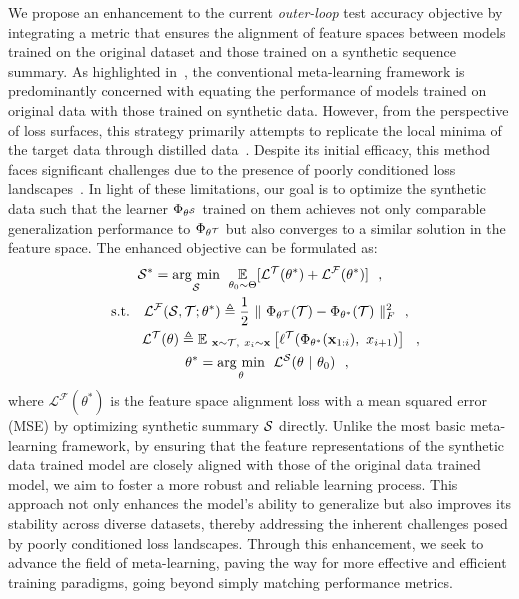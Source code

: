 We propose an enhancement to the current \emph{outer-loop} test accuracy objective by integrating a metric that ensures the alignment of feature spaces between models trained on the original dataset and those trained on a synthetic sequence summary. As highlighted in~\cite{lei2023comprehensive}, the conventional meta-learning framework is predominantly concerned with equating the performance of models trained on original data with those trained on synthetic data. However, from the perspective of loss surfaces, this strategy primarily attempts to replicate the local minima of the target data through distilled data~\cite{li2018visualizing}. Despite its initial efficacy, this method faces significant challenges due to the presence of poorly conditioned loss landscapes~\cite{sachdeva2023data}. In light of these limitations, our goal is to optimize the synthetic data \syn such that the learner $\Phi_{\theta^{\mathcal{S}}}$ trained on them achieves not only comparable generalization performance to $\Phi_{\theta^{\mathcal{T}}}$ but also converges to a similar solution in the feature space. The enhanced objective can be formulated as:
\begin{equation}
\begin{gathered}
    \mathcal{S}^{*} = \underset{\mathcal{S}}{\operatorname{arg}\,\operatorname{min}}\;\  \underset{\theta_0 \sim \Theta}{\mathbb{E}}[\mathcal{L}^{\mathcal{T}}(\theta^*) + \mathcal{L}^{\mathcal{F}}(\theta^*)] ~~, \\
    \text{s.t.} \quad \mathcal{L}^{\mathcal{F}}(\mathcal{S}, \mathcal{T}; \theta^*) \triangleq \frac{1}{2} ~\Vert~ \Phi_{\theta^{\mathcal{T}}}(\mathcal{T}) - \Phi_{\theta^{*}}(\mathcal{T}) ~\Vert_{F}^{2} ~~, \\
    ~~~\qquad \mathcal{L}^{\mathcal{T}}(\theta) \triangleq \mathbb{E}_{~\mathbf{x} \sim \mathcal{T},~ x_i \sim \mathbf{x}} \left[\ell^{\mathcal{T}}(\Phi_{\theta^{*}}(\mathbf{x}_{1:i}),~ x_{i+1})\right] ~~, \\
    \quad \theta^* = \underset{\theta}{\operatorname{arg}\,\operatorname{min}}\;\  \mathcal{L}^{\mathcal{S}}(\theta ~|~ \theta_0) ~~,
\end{gathered}
\end{equation}
where $\mathcal{L}^{\mathcal{F}}(\theta^*)$ is the feature space alignment loss with a mean squared error (MSE) by optimizing synthetic summary $\mathcal{S}$ directly.
Unlike the most basic meta-learning framework, by ensuring that the feature representations of the synthetic data trained model are closely aligned with those of the original data trained model, we aim to foster a more robust and reliable learning process. This approach not only enhances the model's ability to generalize but also improves its stability across diverse datasets, thereby addressing the inherent challenges posed by poorly conditioned loss landscapes. Through this enhancement, we seek to advance the field of meta-learning, paving the way for more effective and efficient training paradigms, going beyond simply matching performance metrics.


